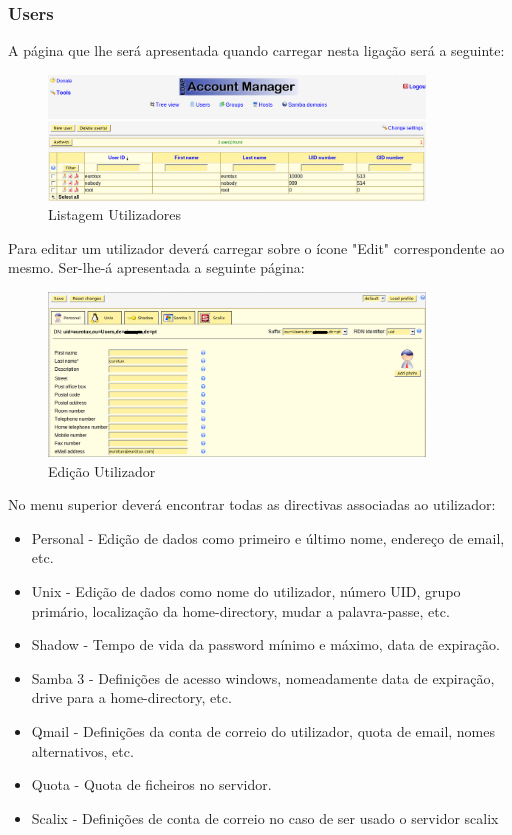 \subsubsection{Users}

A página que lhe será apresentada quando carregar nesta ligação será a seguinte:

\begin{figure}[H]
    \begin{center}
        \includegraphics[width=10cm]{include/img/lam2}
    \end{center}
    \caption{Listagem Utilizadores}
    \label{fig:LAM2}
\end{figure}

Para editar um utilizador deverá carregar sobre o ícone "Edit" correspondente ao mesmo. Ser-lhe-á apresentada a seguinte página:

\begin{figure}[H]
    \begin{center}
        \includegraphics[width=10cm]{include/img/lam4}
    \end{center}
    \caption{Edição Utilizador}
    \label{fig:LAM4}
\end{figure}

No menu superior deverá encontrar todas as directivas associadas ao utilizador:

\begin{itemize}
\item Personal - Edição de dados como primeiro e último nome, endereço de email, etc.
\item Unix - Edição de dados como nome do utilizador, número UID, grupo primário, localização da home-directory, mudar a palavra-passe, etc.
\item Shadow - Tempo de vida da password mínimo e máximo, data de expiração.
\item Samba 3 - Definições de acesso windows, nomeadamente data de expiração, drive para a home-directory, etc.
\item Qmail - Definições da conta de correio do utilizador, quota de email, nomes alternativos, etc.
\item Quota - Quota de ficheiros no servidor.
\item Scalix - Definições de conta de correio no caso de ser usado o servidor scalix
\end{itemize}

